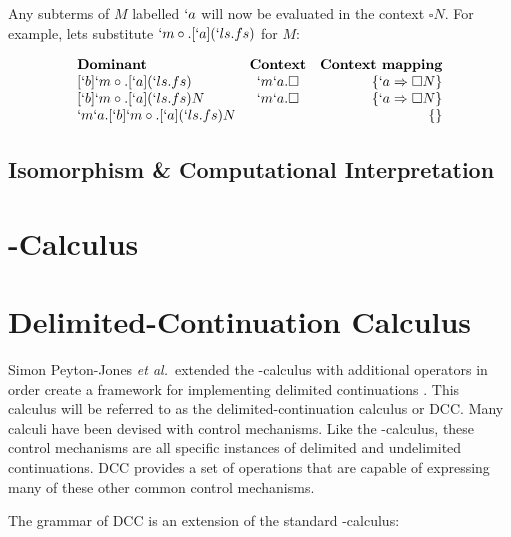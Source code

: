   Any subterms of $M$ labelled $`a$ will now be evaluated in the context 
  $\square N$. For example, lets substitute $`m\circ.[`a](`ls.fs)$ for
  $M$:
  
  \begin{example}
    \[
    \begin{array}{lcr}
    \textbf{Dominant} & \textbf{Context} & \textbf{Context mapping} \\
    {[`b]`m\circ.[`a](`ls.fs)}    & `m`a.\square & \{ `a \Rightarrow \square N \} \\
    {[`b]`m\circ.[`a](`ls.fs)N}   & `m`a.\square & \{ `a \Rightarrow \square N \} \\
    {`m`a.[`b]`m\circ.[`a](`ls.fs)N} &              & \{ \} \\
    \end{array}
    \]
  \end{example}
  
  \subsection{Isomorphism \& Computational Interpretation}

\section{\ltry-Calculus}

\section{Delimited-Continuation Calculus}

  Simon Peyton-Jones \textit{et al.}\ extended the \lam-calculus with additional operators in order create a framework for implementing delimited continuations \cite{JonesDS07}. This calculus will be referred to as the delimited-continuation calculus or DCC. Many calculi have been devised with control mechanisms. Like the \lmu-calculus, these control mechanisms are all specific instances of delimited and undelimited continuations. DCC provides a set of operations that are capable of expressing many of these other common control mechanisms.

  The grammar of DCC is an extension of the standard \lam-calculus:

